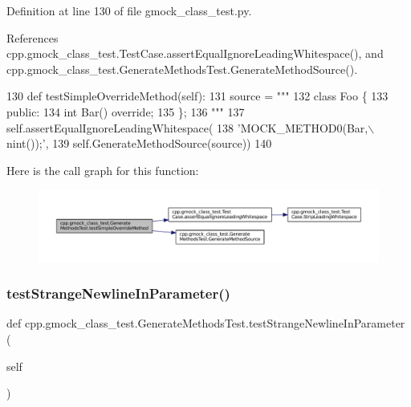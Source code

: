 Definition at line 130 of file gmock\+\_\+class\+\_\+test.\+py.



References cpp.\+gmock\+\_\+class\+\_\+test.\+Test\+Case.\+assert\+Equal\+Ignore\+Leading\+Whitespace(), and cpp.\+gmock\+\_\+class\+\_\+test.\+Generate\+Methods\+Test.\+Generate\+Method\+Source().


\begin{DoxyCode}
130   \textcolor{keyword}{def }testSimpleOverrideMethod(self):
131     source = \textcolor{stringliteral}{"""}
132 \textcolor{stringliteral}{class Foo \{}
133 \textcolor{stringliteral}{ public:}
134 \textcolor{stringliteral}{  int Bar() override;}
135 \textcolor{stringliteral}{\};}
136 \textcolor{stringliteral}{"""}
137     self.assertEqualIgnoreLeadingWhitespace(
138         \textcolor{stringliteral}{'MOCK\_METHOD0(Bar,\(\backslash\)nint());'},
139         self.GenerateMethodSource(source))
140 
\end{DoxyCode}
Here is the call graph for this function\+:
\nopagebreak
\begin{figure}[H]
\begin{center}
\leavevmode
\includegraphics[width=350pt]{classcpp_1_1gmock__class__test_1_1GenerateMethodsTest_a2b1501cf9517acbeb48d11e9d8992a9b_cgraph}
\end{center}
\end{figure}
\mbox{\label{classcpp_1_1gmock__class__test_1_1GenerateMethodsTest_a184995b077a46f3408fa203cb0626614}} 
\subsubsection{\texorpdfstring{test\+Strange\+Newline\+In\+Parameter()}{testStrangeNewlineInParameter()}}
{\footnotesize\ttfamily def cpp.\+gmock\+\_\+class\+\_\+test.\+Generate\+Methods\+Test.\+test\+Strange\+Newline\+In\+Parameter (\begin{DoxyParamCaption}\item[{}]{self }\end{DoxyParamCaption})}



